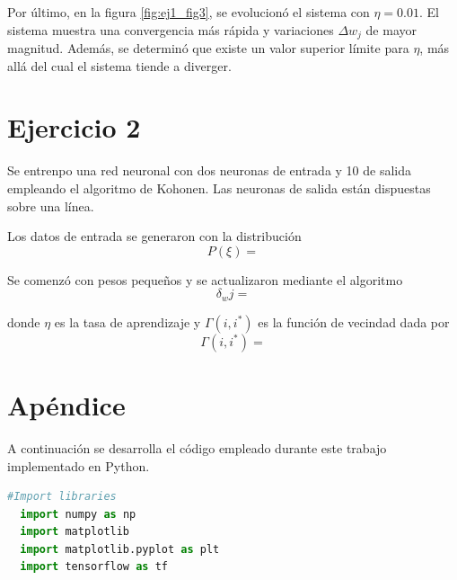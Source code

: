 \documentclass[aps,prb,twocolumn,superscriptaddress,floatfix,longbibliography]{revtex4-2}
\newcounter{para}
\begin{document}
Por último, en la figura \ref{fig:ej1_fig3}, se evolucionó el sistema con $\eta = 0.01$. El sistema muestra una convergencia más rápida y variaciones $\Delta w_j$ de mayor magnitud. Además, se determinó que existe un valor superior límite para $\eta$, más allá del cual el sistema tiende a diverger.

\section*{Ejercicio 2}

Se entrenpo una red neuronal con dos neuronas de entrada y 10 de salida empleando el algoritmo de Kohonen. Las neuronas de salida están dispuestas sobre una línea.

Los datos de entrada se generaron con la distribución
\[P (\xi) = \]

Se comenzó con pesos pequeños y se actualizaron mediante el algoritmo
\[\delta_w{j} = \]


donde $\eta$ es la tasa de aprendizaje y $\Gamma(i, i^*)$ es la función de vecindad dada por
\[\Gamma(i, i^*) = \]




\onecolumngrid

\section*{Apéndice}
A continuación se desarrolla el código empleado durante este trabajo implementado en Python.




\begin{lstlisting}[language=Python]
  #Import libraries
  import numpy as np
  import matplotlib
  import matplotlib.pyplot as plt
  import tensorflow as tf
  
  

\end{lstlisting}


\end{document}
